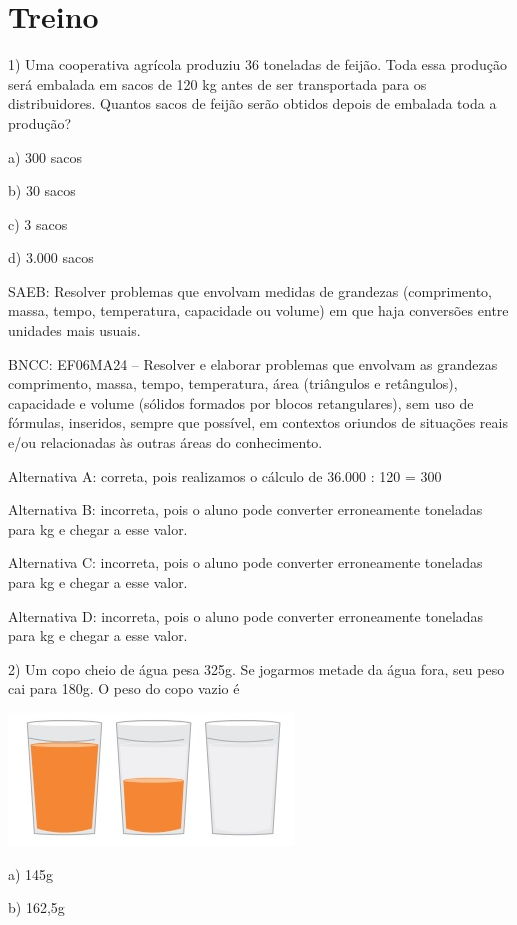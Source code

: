 \section{Treino}

1) Uma cooperativa agrícola produziu 36 toneladas de feijão. Toda essa
produção será embalada em sacos de 120 kg antes de ser transportada para
os distribuidores. Quantos sacos de feijão serão obtidos depois de
embalada toda a produção?

a) 300 sacos

b) 30 sacos

c) 3 sacos

d) 3.000 sacos

SAEB: Resolver problemas que envolvam medidas de grandezas (comprimento,
massa, tempo, temperatura, capacidade ou volume) em que haja conversões
entre unidades mais usuais.

BNCC: EF06MA24 -- Resolver e elaborar problemas que envolvam as
grandezas comprimento, massa, tempo, temperatura, área (triângulos e
retângulos), capacidade e volume (sólidos formados por blocos
retangulares), sem uso de fórmulas, inseridos, sempre que possível, em
contextos oriundos de situações reais e/ou relacionadas às outras áreas
do conhecimento.

Alternativa A: correta, pois realizamos o cálculo de 36.000 : 120 = 300

Alternativa B: incorreta, pois o aluno pode converter erroneamente
toneladas para kg e chegar a esse valor.

Alternativa C: incorreta, pois o aluno pode converter erroneamente
toneladas para kg e chegar a esse valor.

Alternativa D: incorreta, pois o aluno pode converter erroneamente
toneladas para kg e chegar a esse valor.

2) Um copo cheio de água pesa 325g. Se jogarmos metade da água fora, seu
peso cai para 180g. O peso do copo vazio é

\includegraphics[width=2.98958in,height=1.38542in]{./imgSAEB_6_MAT/media/image100.png}

a) 145g

b) 162,5g

